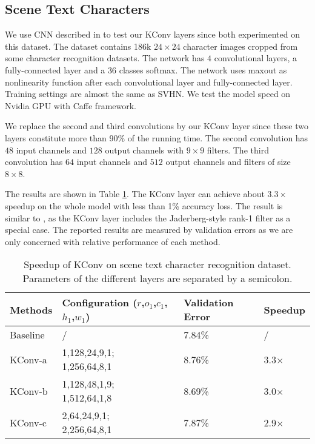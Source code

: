\documentclass{article}
\begin{document}
\subsection{Scene Text Characters}
We use CNN described in \cite{jaderberg2014deep} to test our KConv layers since \cite{DBLP:conf/bmvc/JaderbergVZ14,lebedev2014speeding} both
experimented on this dataset. The dataset contains 186k $24\times 24$ character images cropped from some character recognition datasets. The network
has $4$ convolutional layers, a fully-connected layer and a $36$ classes softmax. The network uses maxout \cite{DBLP:conf/icml/GoodfellowWMCB13} as nonlinearity function after each convolutional layer and fully-connected layer. Training settings are almost the same as SVHN.
We test the model speed on Nvidia GPU with Caffe \cite{jia2014caffe} framework.

We replace the second and third convolutions by our KConv layer since these two layers constitute more than 90\% of the running time. The second convolution has $48$ input channels and $128$ output channels with $9\times 9$ filters. The third convolution has $64$ input channels and $512$ output channels and filters of size $8\times 8$.

The results are shown in Table \ref{tab:kconv}. The KConv layer can achieve about $3.3\times$ speedup on the whole model with less than 1\% accuracy loss. The result is similar to \cite{DBLP:conf/bmvc/JaderbergVZ14}, as the KConv layer includes the Jaderberg-style rank-1 filter as a special case. The reported results are measured by validation errors as we are only concerned with relative performance of each method.

\begin{table}[!ht] \centering \small
\caption{Speedup of KConv on scene text character recognition dataset. Parameters of the different layers are separated by a semicolon.}
 \centering
\begin{tabular}{p{1.5cm} p{2.3cm} p{1.6cm} p{1.3cm}}
    \toprule Methods  & \parbox[]{2.3cm}{Configuration\\($r$,$o_1$,$c_1$,$h_1$,$w_1$)} & Validation Error & Speedup\\
    \midrule Baseline & / &7.84\% & / \\
    \midrule \parbox[c]{\hsize}{KConv-a} & \parbox[]{2.3cm}{1,128,24,9,1;\\ 1,256,64,8,1} &8.76\% & 3.3$\times$ \\
    \midrule \parbox[c]{\hsize}{KConv-b} & \parbox[]{2.3cm}{1,128,48,1,9;\\ 1,512,64,1,8} &8.69\% & 3.0$\times$ \\
    \midrule \parbox[c]{\hsize}{KConv-c} & \parbox[]{2.3cm}{2,64,24,9,1;\\ 2,256,64,8,1} &7.87\% & 2.9$\times$ \\
\hline
\end{tabular}
\label{tab:kconv}
\end{table}
\end{document}
